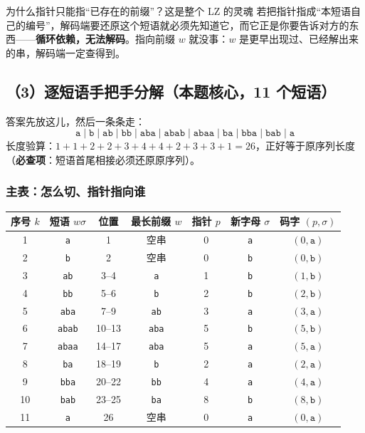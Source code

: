 \documentclass[11pt,a4paper]{ctexart}
\begin{document}
\begin{qa}{为什么指针只能指“已存在的前缀”？这是整个 LZ 的灵魂}
若把指针指成“本短语自己的编号”，解码端要还原这个短语就必须先知道它，而它正是你要告诉对方的东西——\textbf{循环依赖，无法解码}。指向前缀 $w$ 就没事：$w$ 是更早出现过、已经解出来的串，解码端一定查得到。
\end{qa}

\subsection{（3）逐短语手把手分解（本题核心，11 个短语）}

答案先放这儿，然后一条条走：
\[
\texttt{a}\;\big|\;\texttt{b}\;\big|\;\texttt{ab}\;\big|\;\texttt{bb}\;\big|\;\texttt{aba}\;\big|\;\texttt{abab}\;\big|\;\texttt{abaa}\;\big|\;\texttt{ba}\;\big|\;\texttt{bba}\;\big|\;\texttt{bab}\;\big|\;\texttt{a}
\]
长度验算：$1+1+2+2+3+4+4+2+3+3+1=26$，正好等于原序列长度（\textbf{必查项}：短语首尾相接必须还原原序列）。

\subsubsection{主表：怎么切、指针指向谁}

\begingroup
\small
\setlength{\tabcolsep}{4pt}
\begin{center}
\begin{tabular}{@{}c c c c c c c@{}}
\toprule
序号 $k$ & 短语 $w\sigma$ & 位置 & 最长前缀 $w$ & 指针 $p$ & 新字母 $\sigma$ & 码字 $(p,\sigma)$\\
\midrule
1 & \texttt a & 1 & 空串 & 0 & \texttt a & $(0,\texttt a)$\\
2 & \texttt b & 2 & 空串 & 0 & \texttt b & $(0,\texttt b)$\\
3 & \texttt{ab} & 3--4 & \texttt a & 1 & \texttt b & $(1,\texttt b)$\\
4 & \texttt{bb} & 5--6 & \texttt b & 2 & \texttt b & $(2,\texttt b)$\\
5 & \texttt{aba} & 7--9 & \texttt{ab} & 3 & \texttt a & $(3,\texttt a)$\\
6 & \texttt{abab} & 10--13 & \texttt{aba} & 5 & \texttt b & $(5,\texttt b)$\\
7 & \texttt{abaa} & 14--17 & \texttt{aba} & 5 & \texttt a & $(5,\texttt a)$\\
8 & \texttt{ba} & 18--19 & \texttt b & 2 & \texttt a & $(2,\texttt a)$\\
9 & \texttt{bba} & 20--22 & \texttt{bb} & 4 & \texttt a & $(4,\texttt a)$\\
10 & \texttt{bab} & 23--25 & \texttt{ba} & 8 & \texttt b & $(8,\texttt b)$\\
11 & \texttt a & 26 & 空串 & 0 & \texttt a & $(0,\texttt a)$\\
\bottomrule
\end{tabular}
\end{center}
\endgroup
\end{document}
